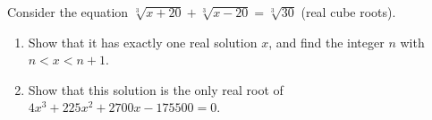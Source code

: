Consider the equation $\sqrt[3]{x+20}+\sqrt[3]{x-20}=\sqrt[3]{30}$ (real cube roots).
\begin{enumerate}
\item[(a)] Show that it has exactly one real solution $x$, and find the integer $n$ with $n<x<n+1$.
\item[(b)] Show that this solution is the only real root of $4x^3+225x^2+2700x-175500=0$.
\end{enumerate}

